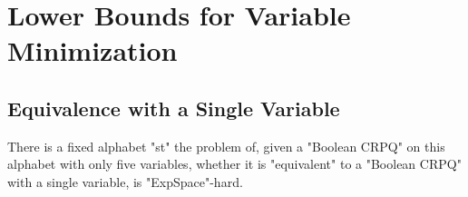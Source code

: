\section{Lower Bounds for Variable Minimization}
\label{apdx-sec:lowerbound-variables}

\subsection{Equivalence with a Single Variable}

\begin{theorem}
	\AP\label{thm:variable-minimization-lowerbound}
	There is a fixed alphabet "st" the problem of, given a "Boolean CRPQ"
	on this alphabet with only five variables, whether it is "equivalent"
	to a "Boolean CRPQ" with a single variable, is "ExpSpace"-hard.
\end{theorem}

